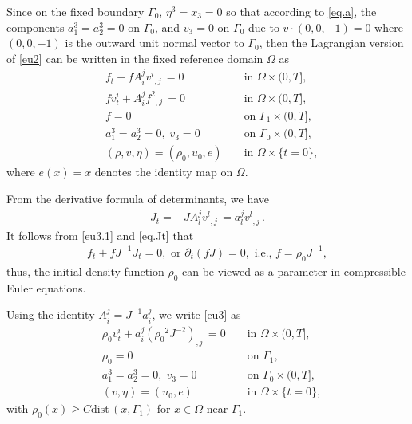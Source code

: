 \documentclass[12pt,twoside,reqno]{amsart}
\numberwithin{equation}{section}
\theoremstyle{definition}
\theoremstyle{remark}
\begin{document}
Since on the fixed boundary $\Gamma_0$, $\eta^3=x_3=0$ so that according to \eqref{eq.a}, the components $a_1^3=a_2^3=0$ on $\Gamma_0$, and $v_3=0$ on $\Gamma_0$ due to $v\cdot(0,0,-1)=0$ where $(0,0,-1)$ is the outward unit normal vector to $\Gamma_0$, then the Lagrangian version of \eqref{eu2} can be written in the fixed reference domain $\Omega$ as
\begin{subequations}\label{eu3}
  \begin{align}
    &f_t+fA_i^j{{{v^i}}_{,{j}}\,}=0  &&\text{ in } \Omega\times(0,T],\label{eu3.1}\\
    &fv_t^i+A_i^j{{{f^2}}_{,{j}}\,}=0 &&\text{ in } \Omega\times(0,T], \label{eu3.2}\\
    &f=0\; &&\text{ on }{\Gamma_1}\times(0,T],\label{eu3.6}\\
    &a_1^3=a_2^3=0,\; v_3=0\; &&\text{ on }{\Gamma_0}\times(0,T],\label{eu3.7}\\
    &(\rho,v,\eta)=({\rho_0},u_0,e) &&\text{ in } \Omega\times\{t=0\},
\end{align}
\end{subequations}
where $e(x)=x$ denotes the identity map on $\Omega$.

From the derivative formula of determinants, we have
\begin{align}
  J_t=&JA^j_l{{{v^l}}_{,{j}}\,}=a^j_l{{{v^l}}_{,{j}}\,}.\label{eq.Jt}
\end{align}
It follows from \eqref{eu3.1} and \eqref{eq.Jt} that
\begin{align}
  f_t+fJ^{-1}J_t=0, \text{ or } {\partial}_t(fJ)=0, \text{ i.e., } f={\rho_0} J^{-1},
\end{align}
thus, the initial density function ${\rho_0}$ can be viewed as a parameter in compressible Euler equations.

Using the identity $A_i^j=J^{-1}a_i^j$, we write \eqref{eu3} as
\begin{subequations}\label{eu4}
  \begin{align}
    &{\rho_0}  v_t^i+a^j_i{{{\left({\rho_0}^2 J^{-2}\right)}}_{,{j}}\,}= 0 &&\text{ in } \Omega\times(0,T], \label{eu4.2}\\
    &{\rho_0}=0\; &&\text{ on } {\Gamma_1},\label{eu4.6}\\
    &a_1^3=a_2^3=0,\; v_3=0\; &&\text{ on }{\Gamma_0}\times(0,T],\label{eu4.7}\\
    &(v,\eta)=(u_0,e) &&\text{ in } \Omega\times\{t=0\},
\end{align}
\end{subequations}
with ${\rho_0}  (x){\geqslant} C{\mathrm{dist}\,}(x,{\Gamma_1})$ for $x\in\Omega$ near ${\Gamma_1}$.
\end{document}
